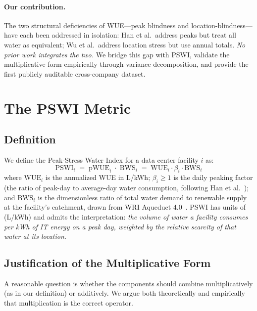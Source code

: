 \documentclass[conference,10pt]{IEEEtran}
\begin{document}
\paragraph{Our contribution.}
The two structural deficiencies of WUE---peak blindness and
location-blindness---have each been addressed in isolation: Han et al.\
address peaks but treat all water as equivalent; Wu et al.\ address
location stress but use annual totals. \emph{No prior work integrates
the two.} We bridge this gap with PSWI, validate the multiplicative form
empirically through variance decomposition, and provide the first
publicly auditable cross-company dataset.

\section{The PSWI Metric}
\label{sec:metric}

\subsection{Definition}

We define the Peak-Stress Water Index for a data center facility $i$ as:
\begin{equation}
\textrm{PSWI}_i \;=\; \textrm{pWUE}_i \;\cdot\; \textrm{BWS}_i
\;=\; \textrm{WUE}_i \cdot \beta_i \cdot \textrm{BWS}_i
\label{eq:pswi}
\end{equation}
where $\textrm{WUE}_i$ is the annualized WUE in L/kWh; $\beta_i \geq 1$
is the daily peaking factor (the ratio of peak-day to average-day water
consumption, following Han et al.~\cite{han2026}); and
$\textrm{BWS}_i$ is the dimensionless ratio of total water demand to
renewable supply at the facility's catchment, drawn from WRI Aqueduct
4.0~\cite{kuzma2023aqueduct}. PSWI has units of (L/kWh) and admits the
interpretation: \emph{the volume of water a facility consumes per kWh
of IT energy on a peak day, weighted by the relative scarcity of that
water at its location.}

\subsection{Justification of the Multiplicative Form}

A reasonable question is whether the components should combine
multiplicatively (as in our definition) or additively. We argue both
theoretically and empirically that multiplication is the correct
operator.
\end{document}
